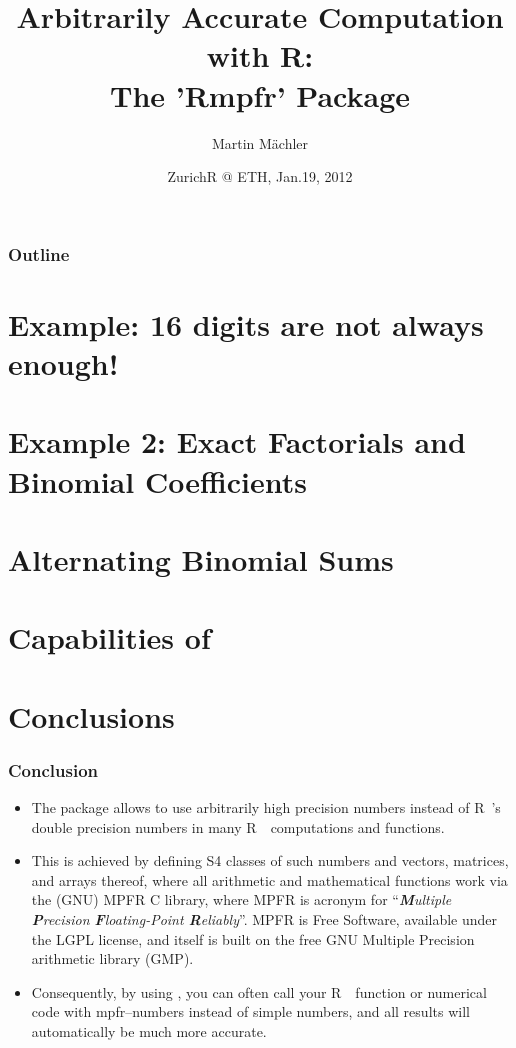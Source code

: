 \documentclass[dvipsnames,pdflatex,beamer]{beamer}
\title[Arbitrarily Accurate R: Package 'Rmpfr']{%
  Arbitrarily Accurate Computation with R: \\ The 'Rmpfr' Package}
\author[Martin M\"achler]{Martin M\"achler}
\institute[R Core/ ETH Zurich]{%
  \begin{minipage}{.44\textwidth}
  \begin{flushleft}
  {\color{Scode}\texttt{maechler@R-project.org} \ \  \ \ (R-Core)}\\
  {\color{Scode}\texttt{maechler@stat.math.ethz.ch}  \ (ETH)}
\end{flushleft}
\end{minipage}

  \bigskip

  Seminar für Statistik \\ ETH Zurich  \ \ Switzerland
}
\date[ZurichR @ ETH, Jan.2012]{ZurichR @ ETH, Jan.19, 2012}
\newcommand{\Rp}{\textsf{R}}
\renewcommand{\R}{\Rp\ }
\begin{document}
\begin{frame} \titlepage
\end{frame}
%
\begin{frame} \frametitle{Outline}
  \tableofcontents[hideallsubsections]
\end{frame}

\section{Example: 16 digits are not always enough!}\label{sec:intro}

\section{Example 2: Exact Factorials and Binomial Coefficients}\label{sec:BinCoef}

\section{Alternating Binomial Sums}


\section{Capabilities of }

% 

\section{Conclusions}
\begin{frame}[fragile]\frametitle{Conclusion}
  \begin{itemize}
  \item  The package  allows
 to use arbitrarily high precision numbers
 instead of \R's double precision numbers in many \R\ computations and functions.

\item
 This is achieved by defining S4 classes of such numbers and vectors,
 matrices, and arrays thereof, where all arithmetic and mathematical
 functions work via the (GNU) MPFR C library, where MPFR is acronym for
 ``\emph{\textbf{M}ultiple \textbf{P}recision \textbf{F}loating-Point \textbf{R}eliably}''.
 MPFR is Free Software, available under the LGPL license, and
 itself is built on the free GNU Multiple Precision arithmetic library (GMP).

\item Consequently, by using , you can often call your \R\ function or
 numerical code with mpfr--numbers instead of simple numbers, and all
 results will automatically be much more accurate.

\end{itemize}

\end{frame}
\end{document}
